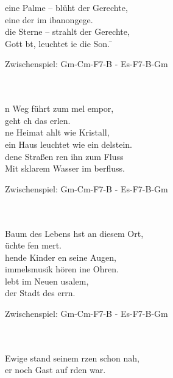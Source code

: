 
\begin{tabbing}
 eine Palme –  blüht der Gerechte,\\
 eine der im ibanongege.\\
 die Sterne –  strahlt der Gerechte,\\
 Gott bt, leuchtet ie die Son. \hspace{40px} \=
\begin{footnotesize}Zwischenspiel: Gm-Cm-F7-B - Es-F7-B-Gm\end{footnotesize}\\
\\
n Weg führt zum mel empor,\\
 geht ch das erlen.\\
ne Heimat ahlt wie Kristall,\\
ein Haus leuchtet wie ein delstein.\\
dene Straßen ren ihn zum Fluss\\
Mit sklarem Wasser im berfluss. \>
\begin{footnotesize}Zwischenspiel: Gm-Cm-F7-B - Es-F7-B-Gm\end{footnotesize}\\
\\
 Baum des Lebens hst an diesem Ort,\\	
üchte fen mert.\\
hende Kinder en seine Augen,\\
immelsmusik hören ine Ohren.\\
 lebt im Neuen usalem,\\
 der Stadt des errn. \>
\begin{footnotesize}Zwischenspiel: Gm-Cm-F7-B - Es-F7-B-Gm\end{footnotesize}\\
\\
 Ewige stand seinem rzen schon nah,\\
 er noch Gast auf rden war.\\

\end{tabbing}
